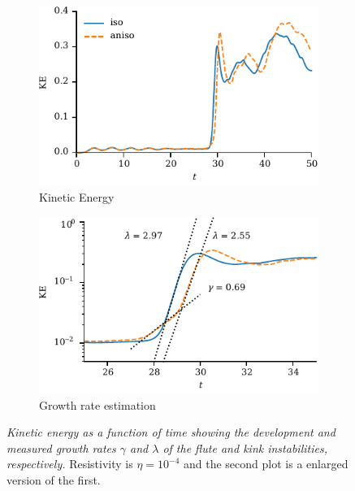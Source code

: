 \documentclass[fleqn,usenatbib]{mnras}
\newcommand{\rs}[2]{{#2}}
\newcommand{\mycaption}[2]{\caption[#1]{\emph{#1} #2}}
\begin{document}
\begin{figure}
  \centering
    \begin{subfigure}{0.49\textwidth}
      \includegraphics[width=\linewidth]{kinetic_energy-4.pdf}
      \caption{Kinetic Energy}
      \label{fig:kink_ke-4}
    \end{subfigure}
    \hfill
    \begin{subfigure}{0.49\textwidth}
      \includegraphics[width=\linewidth]{kinetic_energy_log-4.pdf}
      \caption{Growth rate estimation}
      \label{fig:kink_ke_log-4}
    \end{subfigure}
  \mycaption{Kinetic energy as a function of time showing the
    development and measured growth rates \rs{}{$\gamma$ and $\lambda$}
    of the flute
    and kink instabilities, \rs{}{respectively.}}{\rs{Both plots are from results
      where}{Resistivity is $\eta=10^{-4}$ and the second plot is a
      enlarged version of the first.}}
\label{fig:kink_str8_ke-4}%
\end{figure}
\end{document}
